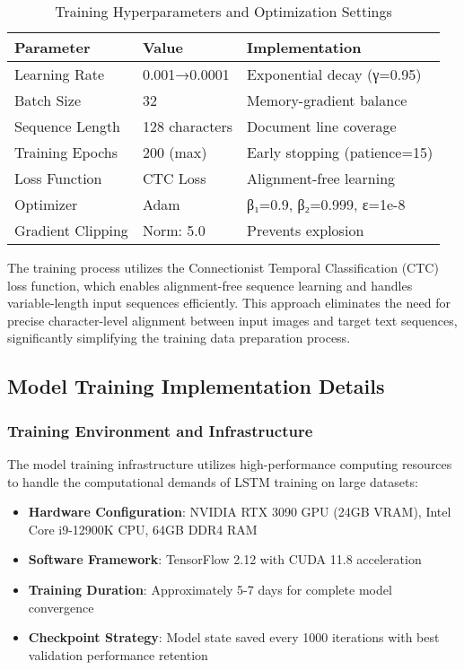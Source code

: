 \begin{table}[H]
\centering
\small
\caption{Training Hyperparameters and Optimization Settings}
\label{tab:training_config}
\begin{tabular}{lll}
\toprule
\textbf{Parameter} & \textbf{Value} & \textbf{Implementation} \\
\midrule
Learning Rate & 0.001→0.0001 & Exponential decay (γ=0.95) \\
Batch Size & 32 & Memory-gradient balance \\
Sequence Length & 128 characters & Document line coverage \\
Training Epochs & 200 (max) & Early stopping (patience=15) \\
Loss Function & CTC Loss & Alignment-free learning \\
Optimizer & Adam & β₁=0.9, β₂=0.999, ε=1e-8 \\
Gradient Clipping & Norm: 5.0 & Prevents explosion \\
\bottomrule
\end{tabular}
\end{table}

The training process utilizes the Connectionist Temporal Classification (CTC) loss function, which enables alignment-free sequence learning and handles variable-length input sequences efficiently. This approach eliminates the need for precise character-level alignment between input images and target text sequences, significantly simplifying the training data preparation process.

\subsection{Model Training Implementation Details}

\subsubsection{Training Environment and Infrastructure}

The model training infrastructure utilizes high-performance computing resources to handle the computational demands of LSTM training on large datasets:

\begin{itemize}
\item \textbf{Hardware Configuration}: NVIDIA RTX 3090 GPU (24GB VRAM), Intel Core i9-12900K CPU, 64GB DDR4 RAM
\item \textbf{Software Framework}: TensorFlow 2.12 with CUDA 11.8 acceleration
\item \textbf{Training Duration}: Approximately 5-7 days for complete model convergence
\item \textbf{Checkpoint Strategy}: Model state saved every 1000 iterations with best validation performance retention
\end{itemize}

